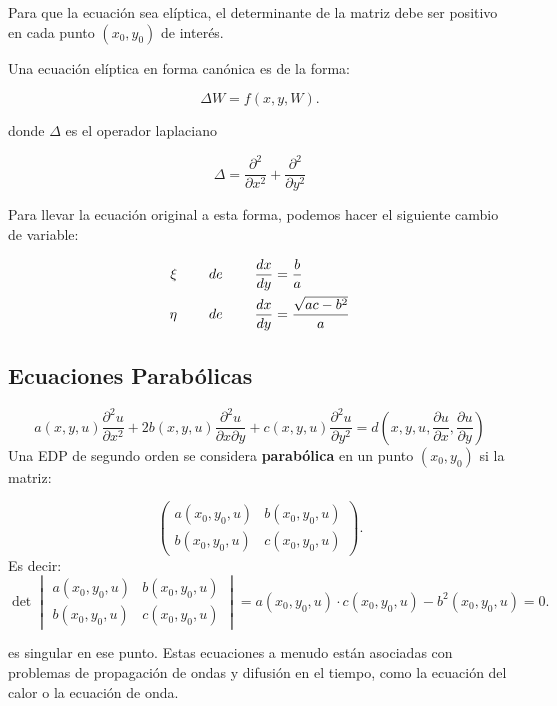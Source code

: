 \documentclass[11pt]{book}
\theoremstyle{plain}
\theoremstyle{definition}
\begin{document}
Para que la ecuación sea elíptica, el determinante de la matriz debe ser positivo en cada punto $(x_0, y_0)$ de interés.

Una ecuación elíptica en forma canónica es de la forma:

\[
\Delta W = f(x, y, W)
.\]

donde $\Delta$ es el operador laplaciano 

$$\Delta = \frac{\partial^2}{\partial x^2} + \frac{\partial^2}{\partial y^2}$$

Para llevar la ecuación original a esta forma, podemos hacer el siguiente cambio de variable:

\begin{align}
    \xi \hspace{8mm}de\hspace{8mm} \frac{dx}{dy} &= \frac{b}{a} \\
    \eta \hspace{8mm}de\hspace{8mm} \frac{dx}{dy} &= \frac{\sqrt{ac-b^{2}}}{a}
\end{align}
\subsection{Ecuaciones Parabólicas}
\setcounter{equation}{0}
\begin{equation}
a(x, y, u) \frac{\partial^2 u}{\partial x^2} + 2 b(x, y, u) \frac{\partial^2 u}{\partial x \partial y} + c(x, y, u) \frac{\partial^2 u}{\partial y^2} = d(x, y, u, \frac{\partial u}{\partial x}, \frac{\partial u}{\partial y})
\end{equation}
Una EDP de segundo orden se considera \textbf{parabólica} en un punto $(x_0, y_0)$ si la matriz:

\[
\begin{pmatrix}
a(x_0, y_0, u) & b(x_0, y_0, u) \\
b(x_0, y_0, u) & c(x_0, y_0, u)
\end{pmatrix}
.\]
Es decir:
\[
\det
\begin{vmatrix}
a(x_0, y_0, u) & b(x_0, y_0, u) \\
b(x_0, y_0, u) & c(x_0, y_0, u)
\end{vmatrix}
= a(x_0, y_0, u) \cdot c(x_0, y_0, u) - b^2(x_0, y_0, u) = 0
.\]

es singular en ese punto. Estas ecuaciones a menudo están asociadas con problemas de propagación de ondas y difusión en el tiempo, como la ecuación del calor o la ecuación de onda.
\end{document}
